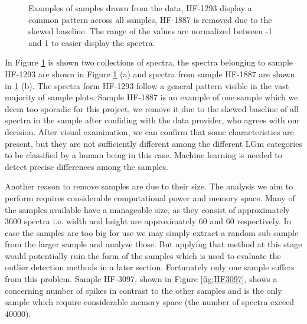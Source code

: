 \begin{figure}[h]

    \centering
    \qquad
    \caption{Examples of samples drawn from the data, HF-1293 display a common pattern across all samples, HF-1887 is removed due to the skewed baseline. The range of the values are normalized between -1 and 1 to easier display the spectra.
    \label{fig:spectrum}}%
\end{figure}

In Figure \ref{fig:spectrum} is shown two collections of spectra, the spectra belonging to sample HF-1293 are shown in Figure \ref{fig:spectrum} (a) and spectra from sample HF-1887 are shown in \ref{fig:spectrum} (b). The spectra form HF-1293 follow a general pattern visible in the vast majority of sample plots.
Sample HF-1887 is an example of one sample which we deem too sporadic for this project, we remove it due to the skewed baseline of all spectra in the sample after confiding with the data provider, who agrees with our decision. After visual examination, we can confirm that some characteristics are present, but they are not sufficiently different among the different LGm categories to be classified by a human being in this case. Machine learning is needed to detect precise differences    among the samples.

Another reason to remove samples are due to their size. The analysis we aim to perform requires considerable computational power and memory space. Many of the samples available have a manageable size, as they consist of approximately $3600$ spectra i.e. width and height are approximately $60$ and $60$ respectively. In case the samples are too big for use we may simply extract a random sub sample from the larger sample and analyze those. But applying that method at this stage would potentially ruin the form of the samples which is used to evaluate the outlier detection methods in a later section. Fortunately only one sample suffers from this problem. Sample HF-3097, shown in Figure \ref{fig:HF3097}, shows a concerning number of spikes in contrast to the other samples and is the only sample which require considerable memory space (the number of spectra exceed $40000$).

